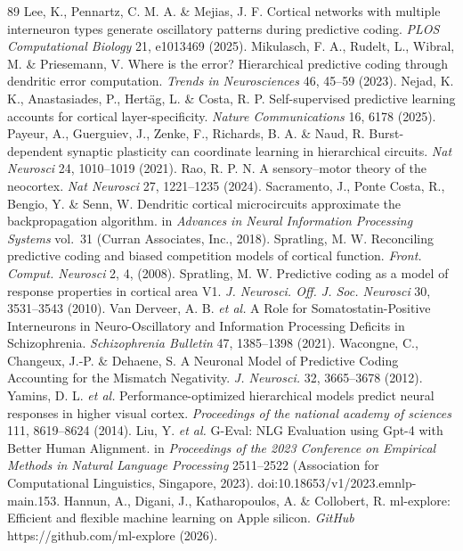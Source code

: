 \documentclass[12pt]{article}
\begin{document}
\begin{thebibliography}{89}
 Lee, K., Pennartz, C. M. A. \& Mejias, J. F. Cortical networks with multiple interneuron types generate oscillatory patterns during predictive coding. \emph{PLOS Computational Biology} 21, e1013469 (2025).
 Mikulasch, F. A., Rudelt, L., Wibral, M. \& Priesemann, V. Where is the error? Hierarchical predictive coding through dendritic error computation. \emph{Trends in Neurosciences} 46, 45--59 (2023).
 Nejad, K. K., Anastasiades, P., Hertäg, L. \& Costa, R. P. Self-supervised predictive learning accounts for cortical layer-specificity. \emph{Nature Communications} 16, 6178 (2025).
 Payeur, A., Guerguiev, J., Zenke, F., Richards, B. A. \& Naud, R. Burst-dependent synaptic plasticity can coordinate learning in hierarchical circuits. \emph{Nat Neurosci} 24, 1010--1019 (2021).
 Rao, R. P. N. A sensory--motor theory of the neocortex. \emph{Nat Neurosci} 27, 1221--1235 (2024).
 Sacramento, J., Ponte Costa, R., Bengio, Y. \& Senn, W. Dendritic cortical microcircuits approximate the backpropagation algorithm. in \emph{Advances in Neural Information Processing Systems} vol.~31 (Curran Associates, Inc., 2018).
 Spratling, M. W. Reconciling predictive coding and biased competition models of cortical function. \emph{Front. Comput. Neurosci} 2, 4, (2008).
 Spratling, M. W. Predictive coding as a model of response properties in cortical area V1. \emph{J. Neurosci. Off. J. Soc. Neurosci} 30, 3531--3543 (2010).
 Van Derveer, A. B. \emph{et al.} A Role for Somatostatin-Positive Interneurons in Neuro-Oscillatory and Information Processing Deficits in Schizophrenia. \emph{Schizophrenia Bulletin} 47, 1385--1398 (2021).
 Wacongne, C., Changeux, J.-P. \& Dehaene, S. A Neuronal Model of Predictive Coding Accounting for the Mismatch Negativity. \emph{J. Neurosci.} 32, 3665--3678 (2012).
 Yamins, D. L. \emph{et al.} Performance-optimized hierarchical models predict neural responses in higher visual cortex. \emph{Proceedings of the national academy of sciences} 111, 8619--8624 (2014).
 Liu, Y. \emph{et al.} G-Eval: NLG Evaluation using Gpt-4 with Better Human Alignment. in \emph{Proceedings of the 2023 Conference on Empirical Methods in Natural Language Processing} 2511--2522 (Association for Computational Linguistics, Singapore, 2023). doi:10.18653/v1/2023.emnlp-main.153.
 Hannun, A., Digani, J., Katharopoulos, A. \& Collobert, R. ml-explore: Efficient and flexible machine learning on Apple silicon. \emph{GitHub} https://github.com/ml-explore (2026).

\end{thebibliography}
\end{document}
